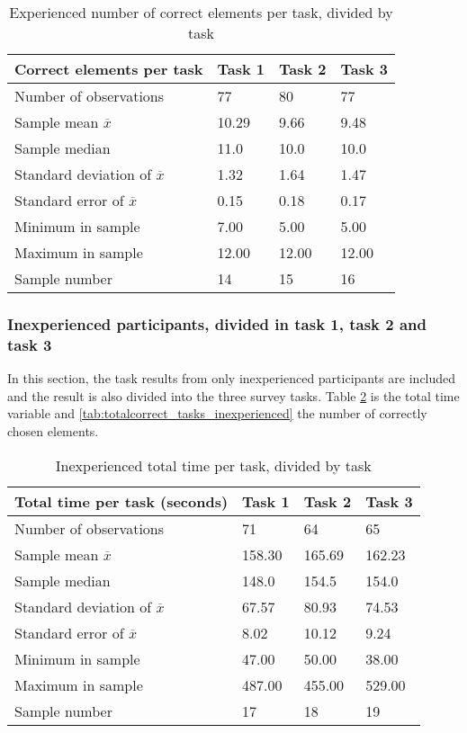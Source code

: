 \begin{table}[H]
	\centering
	\begin{tabular}{l|l|l|l}
		Correct elements per task & Task 1 & Task 2 & Task 3 \\ \hline
		Number of observations & 77    & 80      &  77  \\
		Sample mean $\overline{x}$ & 10.29  &  9.66  &  9.48   \\
		Sample median & 11.0  &  10.0  &  10.0  \\
		Standard deviation of $\overline{x}$ & 1.32  & 1.64  & 1.47   \\
		Standard error of $\overline{x}$ & 0.15  & 0.18  & 0.17   \\
		Minimum in sample & 7.00 & 5.00 &  5.00 \\
		Maximum in sample  & 12.00 & 12.00  & 12.00 \\ \hline
		Sample number & 14 & 15  & 16   \\ \hline
	\end{tabular}
	\caption[Correct elements, task and experienved divided]{Experienced number of correct elements per task, divided by task}
	\label{tab:totalcorrect_tasks_experienced}
\end{table}

\subsubsection{Inexperienced participants, divided in task 1, task 2 and task 3}\label{sec:taskdivided_inexperienced}

In this section, the task results from only inexperienced participants are included and the result is also divided into the three survey tasks. 
Table \ref{tab:totaltime_tasks_inexperienced} is the total time variable and \ref{tab:totalcorrect_tasks_inexperienced} the number of correctly chosen elements. 

\begin{table}[H]
	\centering
	\begin{tabular}{l|l|l|l}
		Total time per task (seconds) & Task 1 & Task 2 & Task 3 \\ \hline
		Number of observations & 71    & 64  & 65   \\
		Sample mean $\overline{x}$  & 158.30  &  165.69  &  162.23  \\
		Sample median & 148.0  &  154.5  &  154.0  \\
		Standard deviation of $\overline{x}$  & 67.57 & 80.93 & 74.53  \\
		Standard error of $\overline{x}$  & 8.02  & 10.12 & 9.24  \\
		Minimum in sample & 47.00 & 50.00 &  38.00 \\
		Maximum in sample & 487.00 & 455.00  & 529.00  \\ \hline
		Sample number & 17 & 18 & 19 \\ \hline
	\end{tabular}
	\caption[Total time, inexperienced per task]{Inexperienced total time per task, divided by task}
	\label{tab:totaltime_tasks_inexperienced}
\end{table}

